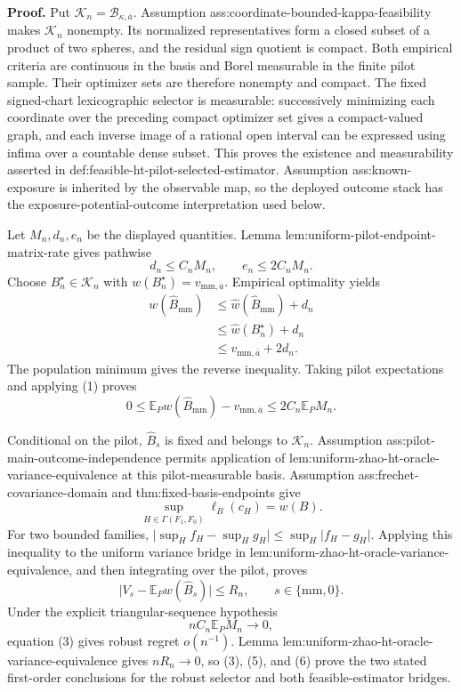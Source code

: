 \textbf{Proof.}
Put \(\mathcal K_n=\mathcal B_{\kappa,\overline a}\).  Assumption ass:coordinate-bounded-kappa-feasibility makes \(\mathcal K_n\) nonempty.  Its normalized representatives form a closed subset of a product of two spheres, and the residual sign quotient is compact.  Both empirical criteria are continuous in the basis and Borel measurable in the finite pilot sample.  Their optimizer sets are therefore nonempty and compact.  The fixed signed-chart lexicographic selector is measurable: successively minimizing each coordinate over the preceding compact optimizer set gives a compact-valued graph, and each inverse image of a rational open interval can be expressed using infima over a countable dense subset.  This proves the existence and measurability asserted in def:feasible-ht-pilot-selected-estimator.  Assumption ass:known-exposure is inherited by the observable map, so the deployed outcome stack has the exposure-potential-outcome interpretation used below.

Let \(M_n,d_n,e_n\) be the displayed quantities.  Lemma lem:uniform-pilot-endpoint-matrix-rate gives pathwise
\[
d_n\le C_nM_n,
\qquad
e_n\le2C_nM_n.
\tag{1}
\]
Choose \(B_n^\star\in\mathcal K_n\) with \(w(B_n^\star)=v_{\mathrm{mm},\overline a}\).  Empirical optimality yields
\[
\begin{aligned}
w(\widehat B_{\mathrm{mm}})
&\le\widehat w(\widehat B_{\mathrm{mm}})+d_n\\
&\le\widehat w(B_n^\star)+d_n\\
&\le v_{\mathrm{mm},\overline a}+2d_n.
\end{aligned}
\tag{2}
\]
The population minimum gives the reverse inequality.  Taking pilot expectations and applying (1) proves
\[
0\le\mathbb E_Pw(\widehat B_{\mathrm{mm}})-v_{\mathrm{mm},\overline a}
\le2C_n\mathbb E_PM_n.
\tag{3}
\]

Conditional on the pilot, \(\widehat B_s\) is fixed and belongs to \(\mathcal K_n\).  Assumption ass:pilot-main-outcome-independence permits application of lem:uniform-zhao-ht-oracle-variance-equivalence at this pilot-measurable basis.  Assumption ass:frechet-covariance-domain and thm:fixed-basis-endpoints give
\[
\sup_{H\in\Gamma(F_1,F_0)}\ell_B(c_H)=w(B).
\tag{4}
\]
For two bounded families, \(\lvert\sup_Hf_H-\sup_Hg_H\rvert\le\sup_H\lvert f_H-g_H\rvert\).  Applying this inequality to the uniform variance bridge in lem:uniform-zhao-ht-oracle-variance-equivalence, and then integrating over the pilot, proves
\[
\lvert V_s-\mathbb E_Pw(\widehat B_s)\rvert\le R_n,
\qquad s\in\{\mathrm{mm},0\}.
\tag{5}
\]
Under the explicit triangular-sequence hypothesis
\[
nC_n\mathbb E_PM_n\longrightarrow0,
\tag{6}
\]
equation (3) gives robust regret \(o(n^{-1})\).  Lemma lem:uniform-zhao-ht-oracle-variance-equivalence gives \(nR_n\to0\), so (3), (5), and (6) prove the two stated first-order conclusions for the robust selector and both feasible-estimator bridges.

